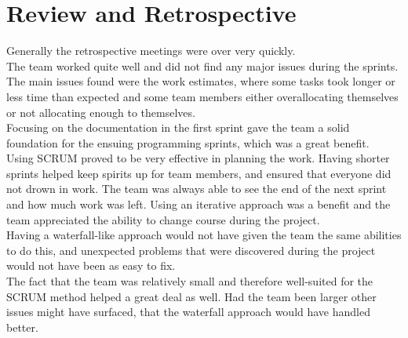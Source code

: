 \section{Review and Retrospective}

Generally the retrospective meetings were over very quickly.\\
The team worked quite well and did not find any major issues during the sprints.\\ 
The main issues found were the work estimates, where some tasks took longer or less time than expected and some team members either overallocating themselves or not allocating enough to themselves.\\
Focusing on the documentation in the first sprint gave the team a solid foundation for the ensuing programming sprints, which was a great benefit.\\
Using SCRUM proved to be very effective in planning the work. Having shorter sprints helped keep spirits up for team members, and ensured that everyone did not drown in work. The team was always able to see the end of the next sprint and how much work was left.
Using an iterative approach was a benefit and the team appreciated the ability to change course during the project. \\
Having a waterfall-like approach would not have given the team the same abilities to do this, and unexpected problems that were discovered during the project would not have been as easy to fix. \\
The fact that the team was relatively small and therefore well-suited for the SCRUM method helped a great deal as well. Had the team been larger other issues might have surfaced, that the waterfall approach would have handled better.